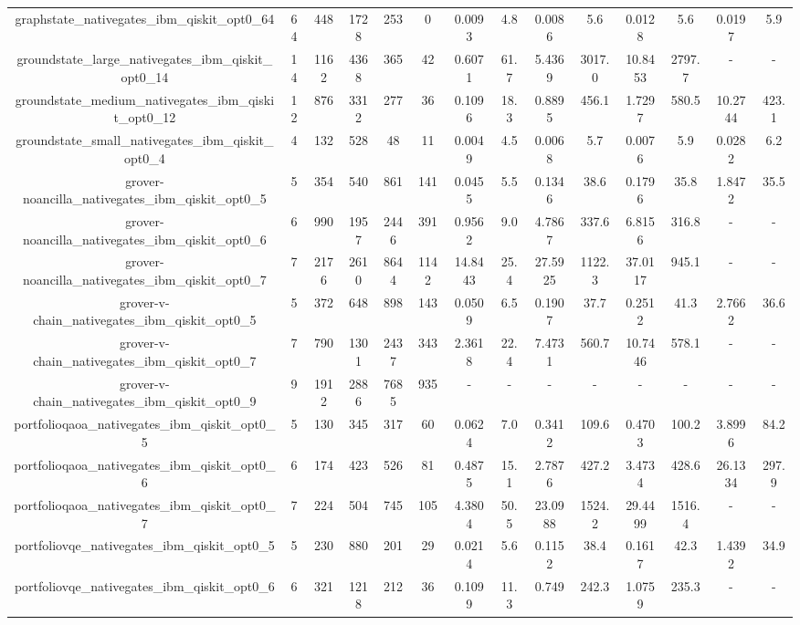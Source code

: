 \begin{table}[htb]
{\begin{tabular}{|c|c|c|c|c|c|c|c|c|c|c|c|c|c|}
graphstate\_nativegates\_ibm\_qiskit\_opt0\_64 & 64 & 448 & 1728 & 253 & 0 & 0.0093 & 4.8 & 0.0086 & 5.6 & 0.0128 & 5.6 & 0.0197 & 5.9 \\ 
groundstate\_large\_nativegates\_ibm\_qiskit\_opt0\_14 & 14 & 1162 & 4368 & 365 & 42 & 0.6071 & 61.7 & 5.4369 & 3017.0 & 10.8453 & 2797.7 & - & - \\ 
groundstate\_medium\_nativegates\_ibm\_qiskit\_opt0\_12 & 12 & 876 & 3312 & 277 & 36 & 0.1096 & 18.3 & 0.8895 & 456.1 & 1.7297 & 580.5 & 10.2744 & 423.1 \\ 
groundstate\_small\_nativegates\_ibm\_qiskit\_opt0\_4 & 4 & 132 & 528 & 48 & 11 & 0.0049 & 4.5 & 0.0068 & 5.7 & 0.0076 & 5.9 & 0.0282 & 6.2 \\ 
grover-noancilla\_nativegates\_ibm\_qiskit\_opt0\_5 & 5 & 354 & 540 & 861 & 141 & 0.0455 & 5.5 & 0.1346 & 38.6 & 0.1796 & 35.8 & 1.8472 & 35.5 \\ 
grover-noancilla\_nativegates\_ibm\_qiskit\_opt0\_6 & 6 & 990 & 1957 & 2446 & 391 & 0.9562 & 9.0 & 4.7867 & 337.6 & 6.8156 & 316.8 & - & - \\ 
grover-noancilla\_nativegates\_ibm\_qiskit\_opt0\_7 & 7 & 2176 & 2610 & 8644 & 1142 & 14.8443 & 25.4 & 27.5925 & 1122.3 & 37.0117 & 945.1 & - & - \\ 
grover-v-chain\_nativegates\_ibm\_qiskit\_opt0\_5 & 5 & 372 & 648 & 898 & 143 & 0.0509 & 6.5 & 0.1907 & 37.7 & 0.2512 & 41.3 & 2.7662 & 36.6 \\ 
grover-v-chain\_nativegates\_ibm\_qiskit\_opt0\_7 & 7 & 790 & 1301 & 2437 & 343 & 2.3618 & 22.4 & 7.4731 & 560.7 & 10.7446 & 578.1 & - & - \\ 
grover-v-chain\_nativegates\_ibm\_qiskit\_opt0\_9 & 9 & 1912 & 2886 & 7685 & 935 & - & - & - & - & - & - & - & - \\ 
portfolioqaoa\_nativegates\_ibm\_qiskit\_opt0\_5 & 5 & 130 & 345 & 317 & 60 & 0.0624 & 7.0 & 0.3412 & 109.6 & 0.4703 & 100.2 & 3.8996 & 84.2 \\ 
portfolioqaoa\_nativegates\_ibm\_qiskit\_opt0\_6 & 6 & 174 & 423 & 526 & 81 & 0.4875 & 15.1 & 2.7876 & 427.2 & 3.4734 & 428.6 & 26.1334 & 297.9 \\ 
portfolioqaoa\_nativegates\_ibm\_qiskit\_opt0\_7 & 7 & 224 & 504 & 745 & 105 & 4.3804 & 50.5 & 23.0988 & 1524.2 & 29.4499 & 1516.4 & - & - \\ 
portfoliovqe\_nativegates\_ibm\_qiskit\_opt0\_5 & 5 & 230 & 880 & 201 & 29 & 0.0214 & 5.6 & 0.1152 & 38.4 & 0.1617 & 42.3 & 1.4392 & 34.9 \\ 
portfoliovqe\_nativegates\_ibm\_qiskit\_opt0\_6 & 6 & 321 & 1218 & 212 & 36 & 0.1099 & 11.3 & 0.749 & 242.3 & 1.0759 & 235.3 & - & - \\ 

\end{tabular}}
\end{table}
